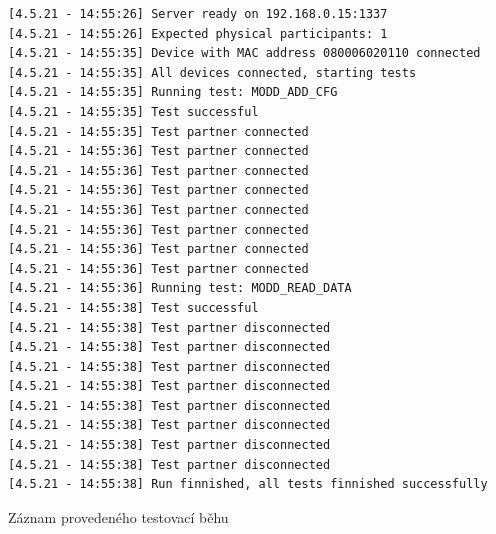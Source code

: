 \begin{listing}[p]
    \centering
    \begin{verbatim}
[4.5.21 - 14:55:26] Server ready on 192.168.0.15:1337
[4.5.21 - 14:55:26] Expected physical participants: 1
[4.5.21 - 14:55:35] Device with MAC address 080006020110 connected
[4.5.21 - 14:55:35] All devices connected, starting tests
[4.5.21 - 14:55:35] Running test: MODD_ADD_CFG
[4.5.21 - 14:55:35] Test successful
[4.5.21 - 14:55:35] Test partner connected
[4.5.21 - 14:55:36] Test partner connected
[4.5.21 - 14:55:36] Test partner connected
[4.5.21 - 14:55:36] Test partner connected
[4.5.21 - 14:55:36] Test partner connected
[4.5.21 - 14:55:36] Test partner connected
[4.5.21 - 14:55:36] Test partner connected
[4.5.21 - 14:55:36] Test partner connected
[4.5.21 - 14:55:36] Running test: MODD_READ_DATA
[4.5.21 - 14:55:38] Test successful
[4.5.21 - 14:55:38] Test partner disconnected
[4.5.21 - 14:55:38] Test partner disconnected
[4.5.21 - 14:55:38] Test partner disconnected
[4.5.21 - 14:55:38] Test partner disconnected
[4.5.21 - 14:55:38] Test partner disconnected
[4.5.21 - 14:55:38] Test partner disconnected
[4.5.21 - 14:55:38] Test partner disconnected
[4.5.21 - 14:55:38] Test partner disconnected
[4.5.21 - 14:55:38] Run finnished, all tests finnished successfully
    \end{verbatim}
    \caption{Záznam provedeného testovací běhu}
    \label{listing:run_log}
\end{listing}
